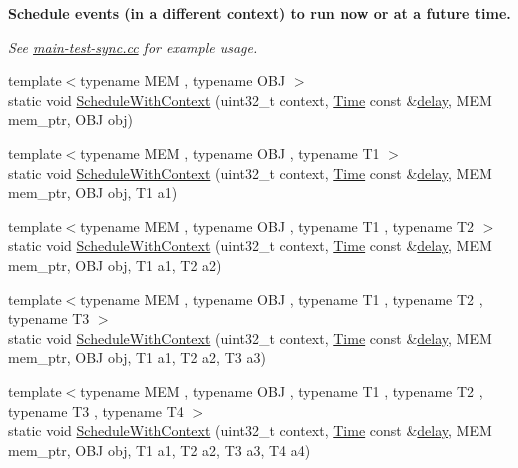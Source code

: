 \begin{Indent}{\bf Schedule events (in a different context) to run now or at a future time.}\par
{\em See \hyperlink{main-test-sync_8cc}{main-\/test-\/sync.\+cc} for example usage. }\begin{DoxyCompactItemize}
\item 
{\footnotesize template$<$typename M\+EM , typename O\+BJ $>$ }\\static void \hyperlink{classns3_1_1Simulator_a86dbaef45a15a42365d7d2ae550449f6}{Schedule\+With\+Context} (uint32\+\_\+t context, \hyperlink{classns3_1_1Time}{Time} const \&\hyperlink{mmwave_2model_2fading-traces_2fading__trace__generator_8m_a7964e6aa8f61a9d28973c8267a606ad8}{delay}, M\+EM mem\+\_\+ptr, O\+BJ obj)
\item 
{\footnotesize template$<$typename M\+EM , typename O\+BJ , typename T1 $>$ }\\static void \hyperlink{classns3_1_1Simulator_a05fc5dc74c103a5f17b3ded0210c0ef9}{Schedule\+With\+Context} (uint32\+\_\+t context, \hyperlink{classns3_1_1Time}{Time} const \&\hyperlink{mmwave_2model_2fading-traces_2fading__trace__generator_8m_a7964e6aa8f61a9d28973c8267a606ad8}{delay}, M\+EM mem\+\_\+ptr, O\+BJ obj, T1 a1)
\item 
{\footnotesize template$<$typename M\+EM , typename O\+BJ , typename T1 , typename T2 $>$ }\\static void \hyperlink{classns3_1_1Simulator_aaa2852d7a4f3698dba2e67e6c69eda4f}{Schedule\+With\+Context} (uint32\+\_\+t context, \hyperlink{classns3_1_1Time}{Time} const \&\hyperlink{mmwave_2model_2fading-traces_2fading__trace__generator_8m_a7964e6aa8f61a9d28973c8267a606ad8}{delay}, M\+EM mem\+\_\+ptr, O\+BJ obj, T1 a1, T2 a2)
\item 
{\footnotesize template$<$typename M\+EM , typename O\+BJ , typename T1 , typename T2 , typename T3 $>$ }\\static void \hyperlink{classns3_1_1Simulator_a29bc8e4fe16d5923c118d8d622760413}{Schedule\+With\+Context} (uint32\+\_\+t context, \hyperlink{classns3_1_1Time}{Time} const \&\hyperlink{mmwave_2model_2fading-traces_2fading__trace__generator_8m_a7964e6aa8f61a9d28973c8267a606ad8}{delay}, M\+EM mem\+\_\+ptr, O\+BJ obj, T1 a1, T2 a2, T3 a3)
\item 
{\footnotesize template$<$typename M\+EM , typename O\+BJ , typename T1 , typename T2 , typename T3 , typename T4 $>$ }\\static void \hyperlink{classns3_1_1Simulator_ae81da106b0969fac249d7c2842d7b6bc}{Schedule\+With\+Context} (uint32\+\_\+t context, \hyperlink{classns3_1_1Time}{Time} const \&\hyperlink{mmwave_2model_2fading-traces_2fading__trace__generator_8m_a7964e6aa8f61a9d28973c8267a606ad8}{delay}, M\+EM mem\+\_\+ptr, O\+BJ obj, T1 a1, T2 a2, T3 a3, T4 a4)

\end{DoxyCompactItemize}
\end{Indent}
